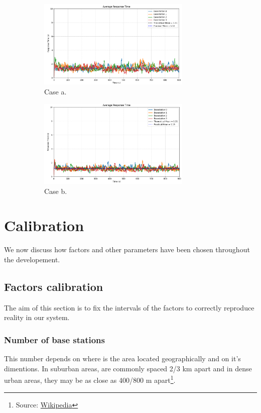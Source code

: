 \documentclass{report}
\begin{document}
\begin{figure}[H]
    \begin{subfigure}{0.55\textwidth}
        \centering
        \includegraphics[width=0.8\textwidth]{img/th_rt_a.png}
        \caption{Case a.}
        \label{th_a}
    \end{subfigure}
    \begin{subfigure}{0.55\textwidth}
        \centering
        \includegraphics[width=0.8\textwidth]{img/th_rt_b.png}
        \caption{Case b.}
        \label{th_b}
    \end{subfigure}
    \caption{}
\end{figure}

\chapter{Calibration}
We now discuss how factors and other parameters have been chosen throughout the developement.

\section{Factors calibration}
The aim of this section is to fix the intervals of the factors to correctly reproduce reality in our system.

\subsection{Number of base stations}
This number depends on where is the area located geographically and on it's dimentions.
In suburban areas, are commonly spaced 2/3 km apart and in dense urban areas, they may be as close as 400/800 m apart\footnote{Source: \href{https://en.wikipedia.org/wiki/Cell_site}{Wikipedia}}.
\end{document}
